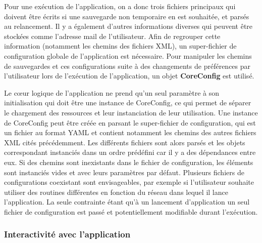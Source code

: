 \documentclass[]{article}
\begin{document}
\par Pour une exécution de l'application, on a donc trois fichiers principaux qui doivent être écrits si une sauvegarde non temporaire en est souhaitée, et parsés au relancement. Il y a également d'autres informations diverses qui peuvent être stockées comme l'adresse mail de l'utilisateur. Afin de regrouper cette information (notamment les chemins des fichiers XML), un super-fichier de configuration globale de l'application est nécessaire. Pour manipuler les chemins de sauvegardes et ces configurations suite à des changements de préférences par l'utilisateur lors de l'exécution de l'application, un objet \textbf{CoreConfig} est utilisé.\\

\par Le cœur logique de l'application ne prend qu'un seul paramètre à son initialisation qui doit être une instance de CoreConfig, ce qui permet de séparer le chargement des ressources et leur instanciation de leur utilisation. Une instance de CoreConfig peut être créée en parsant le super-fichier de configuration, qui est un fichier au format YAML et contient notamment les chemins des autres fichiers XML cités précédemment. Les différents fichiers sont alors parsés et les objets correspondant instanciés dans un ordre prédéfini car il y a des dépendances entre eux. Si des chemins sont inexistants dans le fichier de configuration, les éléments sont instanciés vides et avec leurs paramètres par défaut. Plusieurs fichiers de configurations coexistant sont envisageables, par exemple si l'utilisateur souhaite utiliser des routines différentes en fonction du réseau dans lequel il lance l'application. La seule contrainte étant qu'à un lancement d'application un seul fichier de configuration est passé et potentiellement modifiable durant l'exécution.

\subsubsection{Interactivité avec l'application}
\label{justifinter}
\end{document}
